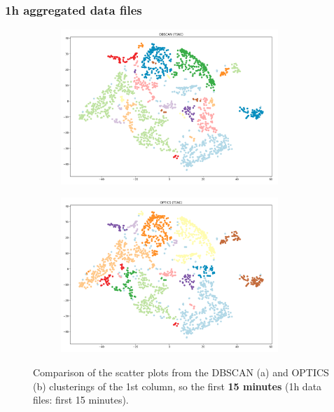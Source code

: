 \subsubsection{1h aggregated data files}

\begin{figure}[H]
	\centering
	\begin{subfigure}{.5\textwidth}
    \centering
    \includegraphics[width=0.9\textwidth]{./images/clusteringResults/1h-1-DBSCAN.png}
  \end{subfigure}%
  \begin{subfigure}{.5\textwidth}
    \centering
    \includegraphics[width=0.9\textwidth]{./images/clusteringResults/1h-1-OPTICS.png}
	\end{subfigure}
	\caption{Comparison of the scatter plots from the DBSCAN (a) and OPTICS (b) clusterings of the 1st column, so the first \textbf{15 minutes} (1h data files: first 15 minutes).}
  \label{figure:finalClustering1h-1}
\end{figure}

